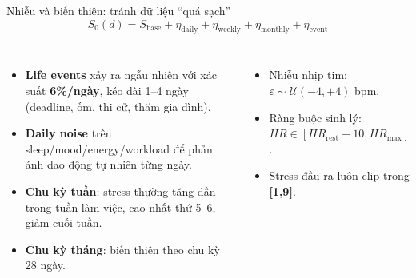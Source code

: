 \documentclass[11pt]{beamer}
\begin{document}
\begin{frame}{Nhiễu và biến thiên: tránh dữ liệu ``quá sạch''}
\footnotesize
\begin{equation*}
S_0(d)=S_{\text{base}}+\eta_{\text{daily}}+\eta_{\text{weekly}}+\eta_{\text{monthly}}+\eta_{\text{event}}
\end{equation*}

\begin{columns}[T]
\begin{itemize}
    \item \textbf{Life events} xảy ra ngẫu nhiên với xác suất \textbf{6\%/ngày}, kéo dài 1--4 ngày (deadline, ốm, thi cử, thăm gia đình).
    \item \textbf{Daily noise} trên sleep/mood/energy/workload để phản ánh dao động tự nhiên từng ngày.
    \item \textbf{Chu kỳ tuần}: stress thường tăng dần trong tuần làm việc, cao nhất thứ 5--6, giảm cuối tuần.
    \item \textbf{Chu kỳ tháng}: biến thiên theo chu kỳ 28 ngày.
\end{itemize}

\begin{itemize}
    \item Nhiễu nhịp tim: $\varepsilon \sim \mathcal{U}(-4,+4)$ bpm.
    \item Ràng buộc sinh lý: $HR \in [HR_{\text{rest}}-10, HR_{\max}]$.
    \item Stress đầu ra luôn clip trong \textbf{[1,9]}.
\end{itemize}
\end{columns}

\vspace{0.05cm}
\end{frame}
\end{document}

